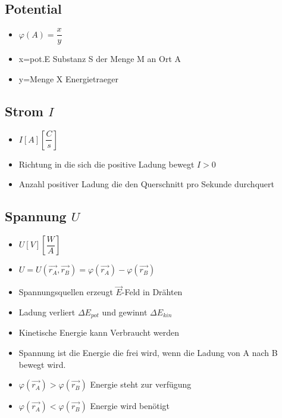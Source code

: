 \documentclass[6pt,a4paper]{scrartcl}
\begin{document}
\begin{multicols*}{4}
\begin{itemize}
			\end{itemize}
		\subsection{Potential }
			\begin{itemize}\itemsep0pt			
				\item $\varphi (A)=\dfrac{x}{y}$
				\item x=pot.E Substanz S der Menge M an Ort A
				\item y=Menge X Energietraeger
			\end{itemize}
			
		\subsection{Strom $I$}
			\begin{itemize}\itemsep0pt				
				\item $I [A] [\dfrac{C}{s}]$
				\item Richtung in die sich die positive Ladung bewegt $I>0$
				\item Anzahl positiver Ladung die den Querschnitt pro Sekunde durchquert
			\end{itemize}
			
		\subsection{Spannung $U$}
			\begin{itemize}\itemsep0pt				
				\item $U [V] [\dfrac{W}{A}]$
				\item $U=U(\overrightarrow{r_{A}},\overrightarrow{r_{B}})=\varphi(\overrightarrow{r_{A}})-\varphi(\overrightarrow{r_{B}})$
				\item Spannungsquellen erzeugt $\overrightarrow{E}$-Feld in Drähten
				\item Ladung verliert $\Delta E_{pot}$ und gewinnt $\Delta E_{kin}$
				\item Kinetische Energie kann Verbraucht werden
				\item Spannung ist die Energie die frei wird, wenn die Ladung von A nach B bewegt wird.
				\item $\varphi(\overrightarrow{r_{A}})>\varphi(\overrightarrow{r_{B}})$ Energie steht zur verfügung
				\item $\varphi(\overrightarrow{r_{A}})<\varphi(\overrightarrow{r_{B}})$ Energie wird benötigt
			\end{itemize}
			

\end{multicols*}
\end{document}
